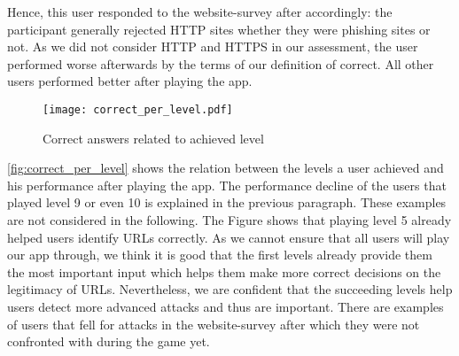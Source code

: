 \begin{description}[leftmargin=0cm]
	Hence, this user responded to the website-survey after accordingly: the participant generally rejected HTTP sites whether they were phishing sites or not. As we did not consider HTTP and HTTPS in our assessment, the user performed worse afterwards by the terms of our definition of correct.
	All other users performed better after playing the app.
	\item[Relation Between Achieved Level and Identified Websites] 
		\begin{figure}
			\centering
			\texttt{[image: correct\_per\_level.pdf]}
			\caption{Correct answers related to achieved level}
			\label{fig:correct_per_level}
			\end{figure}
	\autoref{fig:correct_per_level} shows the relation between the levels a user achieved and his performance after playing the app. The performance decline of the users that played level 9 or even 10 is explained in the previous paragraph. These examples are not considered in the following. The Figure shows that playing level 5 already helped users identify URLs correctly.
As we cannot ensure that all users will play our app through, we think it is good that the first levels already provide them the most important input which helps them make more correct decisions on the legitimacy of URLs. 
Nevertheless, we are confident that the succeeding levels help users detect more advanced attacks and thus are important. There are examples of users that fell for attacks in the website-survey after which they were not confronted with during the game yet.


\end{description}
